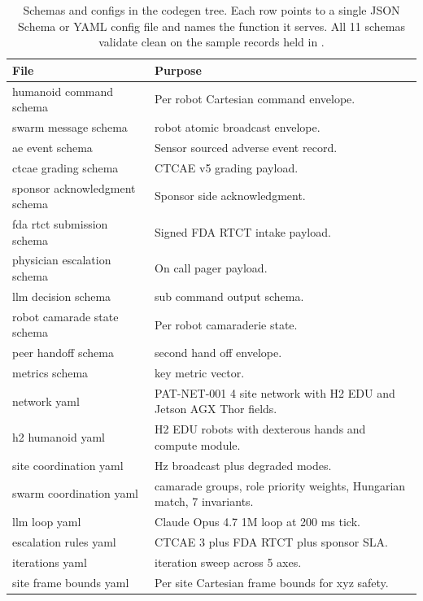 \begin{sectionaccent}
\begin{table}[H]
\captionsetup{type=table}
\caption{Schemas and configs in the codegen tree. Each row points to
a single JSON Schema or YAML config file and names the function it
serves. All 11 schemas validate clean on the sample records held in
.}
\label{tbl:schemas-configs}
\small
\begin{tabular}{>{\raggedright\arraybackslash}p{5cm}
                >{\raggedright\arraybackslash}p{10cm}}
\toprule
\textbf{File} & \textbf{Purpose} \\
\midrule
humanoid command schema & Per robot Cartesian command envelope. \\
swarm message schema & 3 robot atomic broadcast envelope. \\
ae event schema & Sensor sourced adverse event record. \\
ctcae grading schema & CTCAE v5 grading payload. \\
sponsor acknowledgment schema & Sponsor side acknowledgment. \\
fda rtct submission schema & Signed FDA RTCT intake payload. \\
physician escalation schema & On call pager payload. \\
llm decision schema & 3 sub command output schema. \\
robot camarade state schema & Per robot camaraderie state. \\
peer handoff schema & 2 second hand off envelope. \\
metrics schema & 26 key metric vector. \\
network yaml & PAT-NET-001 4 site network with H2 EDU and Jetson AGX Thor fields. \\
h2 humanoid yaml & 12 H2 EDU robots with dexterous hands and compute module. \\
site coordination yaml & 1 Hz broadcast plus degraded modes. \\
swarm coordination yaml & 4 camarade groups, role priority weights, Hungarian match, 7 invariants. \\
llm loop yaml & Claude Opus 4.7 1M loop at 200 ms tick. \\
escalation rules yaml & CTCAE 3 plus FDA RTCT plus sponsor SLA. \\
iterations yaml & 32 iteration sweep across 5 axes. \\
site frame bounds yaml & Per site Cartesian frame bounds for xyz safety. \\
\bottomrule
\end{tabular}
\end{table}


\end{sectionaccent}
